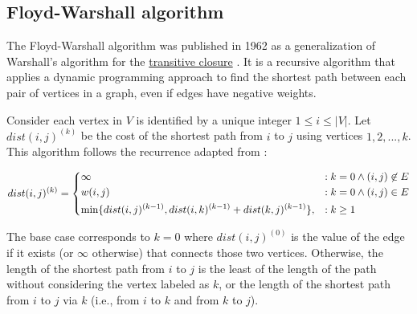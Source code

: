 \subsection{Floyd-Warshall algorithm} \label{algorithm-shortestpath-floydwarshall}
The Floyd-Warshall algorithm was published in 1962 as a generalization of Warshall's algorithm for the \hyperref[def:desc]{transitive closure} \cite[p.~346]{floyd-alg}. It is a \gls{recursive} algorithm that applies a \gls{dynamic programming} approach 
to find the shortest path between each pair of vertices in a graph, even if edges have negative weights.\par
Consider each vertex in $V$ is identified by a unique integer $1 \leq i \leq |V|$.
Let $dist(i, j)^{(k)}$ be the cost of the shortest path from $i$ to $j$ using vertices $1, 2, ..., k$.
This algorithm follows the recurrence adapted from \cite{intro-alg}:

\begin{equation}
    dist(i,j)^{(k)}=\begin{dcases}
        \infty                                                         &: k=0 \wedge (i,j) \not \in E \\
        w(i,j)                                                         &: k=0 \wedge (i,j) \in E\\
        \min\{dist(i,j)^{(k-1)}, dist(i,k)^{(k-1)} + dist(k,j)^{(k-1)}\}, &: k \geq 1
    \end{dcases}
\end{equation}

The base case corresponds to $k=0$ where $dist(i, j)^{(0)}$ is the value of the edge if it exists (or $\infty$ otherwise) that connects those two vertices.
Otherwise, the length of the shortest path from $i$ to $j$ is the least of the length of the path without considering the vertex labeled as $k$,
or the length of the shortest path from $i$ to $j$ via $k$ (i.e., from $i$ to $k$ and from $k$ to $j$).\par

